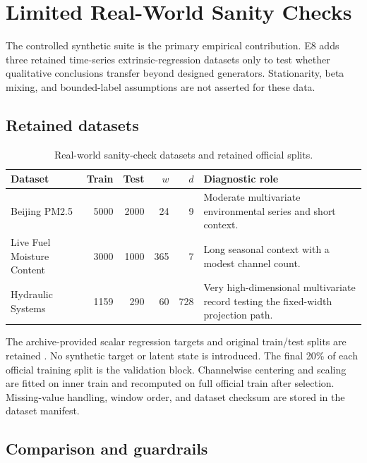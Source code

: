 \section{Limited Real-World Sanity Checks}
\label{app:real-world-sanity}

The controlled synthetic suite is the primary empirical contribution.  E8 adds
three retained time-series extrinsic-regression datasets only to test whether
qualitative conclusions transfer beyond designed generators.  Stationarity,
beta mixing, and bounded-label assumptions are not asserted for these data.

\subsection{Retained datasets}
\label{app:real-world-datasets}

\begin{table}[H]
\centering
\small
\caption{Real-world sanity-check datasets and retained official splits.}
\label{tab:real-world-sanity}
\begin{tabularx}{\linewidth}{@{}lrrrrX@{}}
\toprule
Dataset & Train & Test & \(w\) & \(d\) & Diagnostic role \\
\midrule
Beijing PM2.5
  & 5000 & 2000 & 24 & 9
  & Moderate multivariate environmental series and short context. \\
Live Fuel Moisture Content
  & 3000 & 1000 & 365 & 7
  & Long seasonal context with a modest channel count. \\
Hydraulic Systems
  & 1159 & 290 & 60 & 728
  & Very high-dimensional multivariate record testing the fixed-width projection path. \\
\bottomrule
\end{tabularx}
\end{table}

The archive-provided scalar regression targets and original train/test splits
are retained \citep{TanEtAl2021TSER}.  No synthetic target or latent state is
introduced.  The final 20\% of each official training split is the validation
block.  Channelwise centering and scaling are fitted on inner train and
recomputed on full official train after selection.  Missing-value handling,
window order, and dataset checksum are stored in the dataset manifest.

\subsection{Comparison and guardrails}
\label{app:real-world-protocol}

